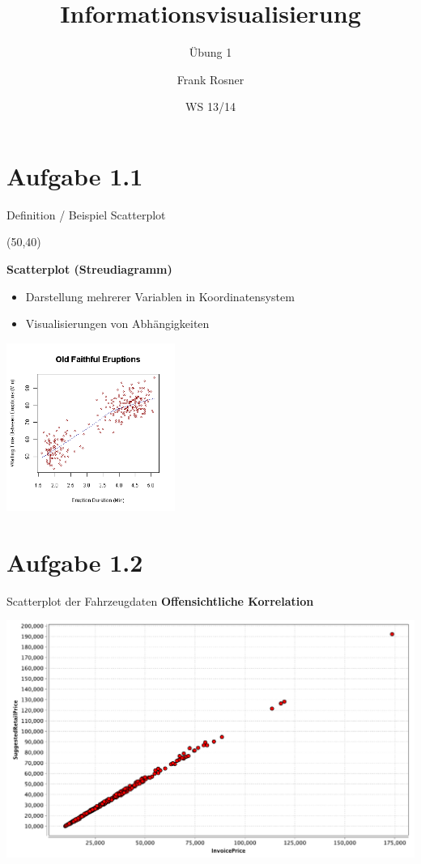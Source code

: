 \documentclass{beamer}
\title{Informationsvisualisierung}
\subtitle{Übung 1}
\author{
Frank Rosner
}
\institute{
Martin-Luther-Universität Halle-Wittenberg
}
\date{WS 13/14}
\begin{document}
\frame{\titlepage}

\section{Aufgabe 1.1}

\begin{frame}{Definition / Beispiel Scatterplot}
\begin{textblock}{80}(50,40)

\end{textblock}
\textbf{Scatterplot (Streudiagramm)}
\begin{itemize}
\item Darstellung mehrerer Variablen in Koordinatensystem
\item Visualisierungen von Abhängigkeiten
\end{itemize}
\begin{center}
\includegraphics[width=5.5cm, trim=1.5cm 2cm 1cm 2cm, clip=true]{Oldfaithful3.png}
\end{center}
\vspace*{-1em}
\end{frame}

\section{Aufgabe 1.2}

\begin{frame}{Scatterplot der Fahrzeugdaten}
\textbf{Offensichtliche Korrelation}
\begin{center}
\includegraphics[width=1\linewidth]{U1_InvoicePrice_SuggestedRetailPrice.pdf}
\end{center}
\end{frame}
\end{document}

